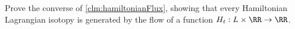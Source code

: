 

	Prove the converse of \cref{clm:hamiltonianFlux}, showing that every Hamiltonian Lagrangian isotopy is generated by the flow of a function $H_t: L\times \RR\to \RR$. 

